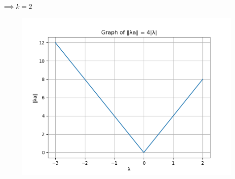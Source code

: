 \documentclass[journal]{IEEEtran}
\begin{document}
\begin{center}
$\implies k = 2$
\end{center}
\begin{figure}[H]
\begin{center}
\includegraphics[width=0.6\columnwidth]{Figs/Fig1.png}
\end{center}
\caption{}
\label{fig:Fig.1}
\end{figure}
\end{document}
